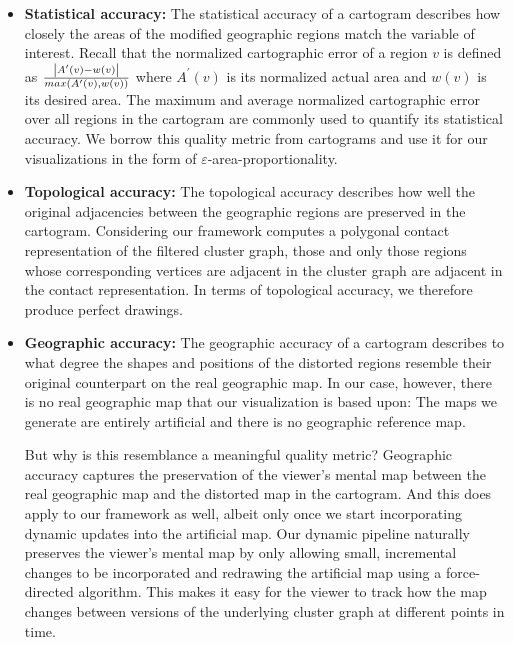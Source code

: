 \begin{itemize}
\item \textbf{Statistical accuracy:}
The statistical accuracy of a cartogram describes how closely the areas of the modified geographic regions match the variable of interest.
Recall that the normalized cartographic error of a region $v$ is defined as $\frac{\left\lvert A^\prime(v)-w(v)\right\rvert}{max(A^\prime(v),w(v))}$ where $A^\prime(v)$ is its normalized actual area and $w(v)$ is its desired area.
The maximum and average normalized cartographic error over all regions in the cartogram are commonly used to quantify its statistical accuracy.
We borrow this quality metric from cartograms and use it for our visualizations in the form of $\varepsilon$-area-proportionality.

\item \textbf{Topological accuracy:}
The topological accuracy describes how well the original adjacencies between the geographic regions are preserved in the cartogram.
Considering our framework computes a polygonal contact representation of the filtered cluster graph, those and only those regions whose corresponding vertices are adjacent in the cluster graph are adjacent in the contact representation.
In terms of topological accuracy, we therefore produce perfect drawings.

\item \textbf{Geographic accuracy:}
The geographic accuracy of a cartogram describes to what degree the shapes and positions of the distorted regions resemble their original counterpart on the real geographic map.
In our case, however, there is no real geographic map that our visualization is based upon:
The maps we generate are entirely artificial and there is no geographic reference map.

But why is this resemblance a meaningful quality metric?
Geographic accuracy captures the preservation of the viewer's mental map between the real geographic map and the distorted map in the cartogram.
And this does apply to our framework as well, albeit only once we start incorporating dynamic updates into the artificial map.
Our dynamic pipeline naturally preserves the viewer's mental map by only allowing small, incremental changes to be incorporated and redrawing the artificial map using a force-directed algorithm.
This makes it easy for the viewer to track how the map changes between versions of the underlying cluster graph at different points in time.
\end{itemize}



